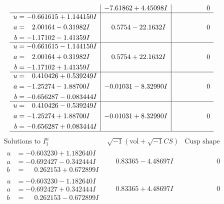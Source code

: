 \documentclass[1p]{elsarticle_modified}
\theoremstyle{definition}
\newcommand{\I}{\sqrt{-1}}
\begin{document}
$$\begin{array}{c|c|c}
 & -7.61862 + 4.45098 I & \phantom{-0.000000 } 0 \\ \hline\begin{aligned}
u &= -0.661615 + 1.144150 I \\
a &= \phantom{-}2.00164 - 0.31982 I \\
b &= -1.17102 - 1.41359 I\end{aligned}
 & \phantom{-}0.5754 - 22.1632 I & \phantom{-0.000000 } 0 \\ \hline\begin{aligned}
u &= -0.661615 - 1.144150 I \\
a &= \phantom{-}2.00164 + 0.31982 I \\
b &= -1.17102 + 1.41359 I\end{aligned}
 & \phantom{-}0.5754 + 22.1632 I & \phantom{-0.000000 } 0 \\ \hline\begin{aligned}
u &= \phantom{-}0.410426 + 0.539249 I \\
a &= -1.25274 - 1.88700 I \\
b &= -0.656287 - 0.083444 I\end{aligned}
 & -0.01031 - 8.32990 I & \phantom{-0.000000 } 0 \\ \hline\begin{aligned}
u &= \phantom{-}0.410426 - 0.539249 I \\
a &= -1.25274 + 1.88700 I \\
b &= -0.656287 + 0.083444 I\end{aligned}
 & -0.01031 + 8.32990 I & \phantom{-0.000000 } 0\\
 \hline 
 \end{array}$$\newpage$$\begin{array}{c|c|c}  
\text{Solutions to }I^u_{1}& \I (\text{vol} + \sqrt{-1}CS) & \text{Cusp shape}\\
 \hline 
\begin{aligned}
u &= -0.603230 + 1.182640 I \\
a &= -0.692427 - 0.342444 I \\
b &= \phantom{-}0.262153 + 0.672899 I\end{aligned}
 & \phantom{-}0.83365 - 4.48697 I & \phantom{-0.000000 } 0 \\ \hline\begin{aligned}
u &= -0.603230 - 1.182640 I \\
a &= -0.692427 + 0.342444 I \\
b &= \phantom{-}0.262153 - 0.672899 I\end{aligned}
 & \phantom{-}0.83365 + 4.48697 I & \phantom{-0.000000 } 0 \\ \hline\begin{aligned}

\end{aligned}
\end{array}$$
\end{document}

